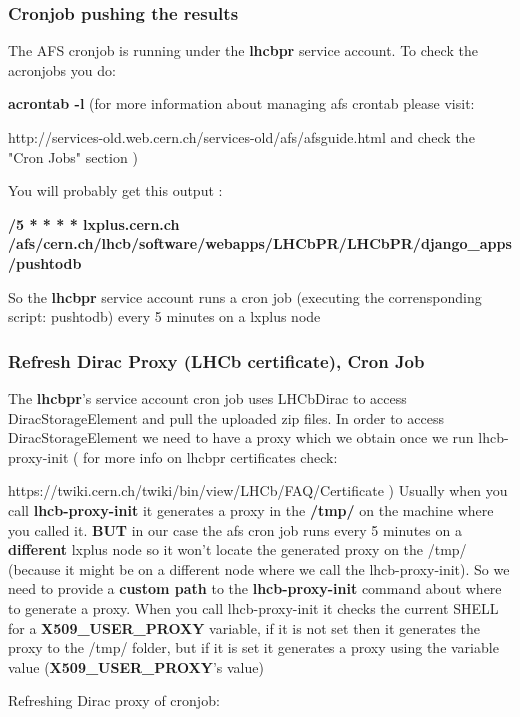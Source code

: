 \documentclass{lhcbnote}
\begin{document}
\subsubsection {Cronjob pushing the results}

The AFS cronjob is running under the {\bf lhcbpr} service account. To check the acronjobs you do:

\vspace {2mm}
{\bf acrontab -l} (for more information about managing afs crontab please visit: 

http://services-old.web.cern.ch/services-old/afs/afsguide.html and check the "Cron Jobs" section )

\vspace {2mm}
You will probably get this output : 

{\bf */5 * * * * lxplus.cern.ch /afs/cern.ch/lhcb/software/webapps/LHCbPR/LHCbPR/django\_apps/pushtodb}

\vspace {2mm}

So the {\bf lhcbpr} service account runs a cron job (executing the corrensponding script: pushtodb) every 5 minutes on a lxplus node


\subsubsection {Refresh Dirac Proxy (LHCb certificate), Cron Job}

The {\bf lhcbpr}'s service account cron job uses LHCbDirac to access DiracStorageElement and pull the uploaded zip files. In order to access DiracStorageElement 
we need to have a proxy which we obtain once we run lhcb-proxy-init ( for more info on lhcbpr certificates check: 

https://twiki.cern.ch/twiki/bin/view/LHCb/FAQ/Certificate )
Usually when you call {\bf lhcb-proxy-init} it generates a proxy in the {\bf /tmp/} on the machine where you called it. {\bf BUT} in our case the afs cron job runs every 5 minutes 
on a {\bf different} lxplus node so it won't locate the generated proxy on the /tmp/ (because it might be on a different node where we call the lhcb-proxy-init). 
So we need to provide a {\bf custom path} to the {\bf lhcb-proxy-init} command about where to generate a proxy. When you call lhcb-proxy-init it checks the current SHELL for a 
{\bf X509\_USER\_PROXY} variable, if it is not set then it generates the proxy to the /tmp/ folder, but if it is set it generates a proxy using the variable value ({\bf X509\_USER\_PROXY}'s value)

\vspace {4mm}

Refreshing Dirac proxy of cronjob:
\end{document}
